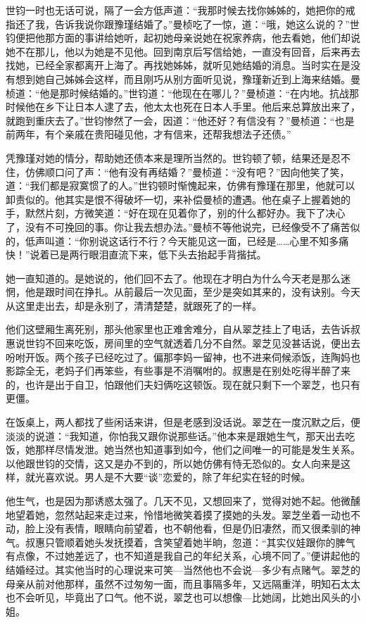 \par 世钧一时也无话可说，隔了一会方低声道：“我那时候去找你姊姊的，她把你的戒指还了我，告诉我说你跟豫瑾结婚了。”曼桢吃了一惊，道：“哦，她这么说的？”世钧便把他那方面的事讲给她听，起初她母亲说她在祝家养病，他去看她，他们却说她不在那儿，他以为她是不见他。回到南京后写信给她，一直没有回音，后来再去找她，已经全家都离开上海了。再找她姊姊，就听见她结婚的消息。当时实在是没有想到她自己姊姊会这样，而且刚巧从别方面听见说，豫瑾新近到上海来结婚。曼桢道：“他是那时候结婚的。”世钧道：“他现在在哪儿？”曼桢道：“在内地。抗战那时候他在乡下让日本人逮了去，他太太也死在日本人手里。他后来总算放出来了，就跑到重庆去了。”世钧惨然了一会，因道：“他还好？有信没有？”曼桢道：“也是前两年，有个亲戚在贵阳碰见他，才有信来，还帮我想法子还债。”
\par 凭豫瑾对她的情分，帮助她还债本来是理所当然的。世钧顿了顿，结果还是忍不住，仿佛顺口问了声：“他有没有再结婚？”曼桢道：“没有吧？”因向他笑了笑，道：“我们都是寂寞惯了的人。”世钧顿时惭愧起来，仿佛有豫瑾在那里，他就可以卸责似的。他其实是恨不得破坏一切，来补偿曼桢的遭遇。他在桌子上握着她的手，默然片刻，方微笑道：“好在现在见着你了，别的什么都好办。我下了决心了，没有不可挽回的事。你让我去想办法。”曼桢不等他说完，已经像受不了痛苦似的，低声叫道：“你别说这话行不行？今天能见这一面，已经是……心里不知多痛快！”说着已是两行眼泪直流下来，低下头去抬起手背揩拭。
\par 她一直知道的。是她说的，他们回不去了。他现在才明白为什么今天老是那么迷惘，他是跟时间在挣扎。从前最后一次见面，至少是突如其来的，没有诀别。今天从这里走出去，却是永别了，清清楚楚，就跟死了的一样。
\par 他们这壁厢生离死别，那头他家里也正难舍难分，自从翠芝挂上了电话，去告诉叔惠说世钧不回来吃饭，房间里的空气就透着几分不自然。翠芝见没甚话说，便出去吩咐开饭。两个孩子已经吃过了。偏那李妈一留神，也不进来伺候添饭，连陶妈也影踪全无，老妈子们再笨些，有些事是不消嘱咐的。叔惠是在别处吃得半醉了来的，也许是出于自卫，怕跟他们夫妇俩吃这顿饭。现在就只剩下一个翠芝，也只有更僵。
\par 在饭桌上，两人都找了些闲话来讲，但是老感到没话说。翠芝在一度沉默之后，便淡淡的说道：“我知道，你怕我又跟你说那些话。”他本来是跟她生气，那天出去吃饭，她那样尽情发泄。她当然也知道事到如今，他们之间唯一的可能是发生关系。以他跟世钧的交情，这又是办不到的，所以她仿佛有恃无恐似的。女人向来是这样，就光喜欢说。男人是不大要“谈”恋爱的，除了年纪实在轻的时候。
\par 他生气，也是因为那诱惑太强了。几天不见，又想回来了，觉得对她不起。他微醺地望着她，忽然站起来走过来，怜惜地微笑着摸了摸她的头发。翠芝坐着一动也不动，脸上没有表情，眼睛向前望着，也不朝他看，但是仍旧凄然，而又很柔驯的神气。叔惠只管顺着她头发抚摸着，含笑望着她半晌，忽道：“其实仪娃跟你的脾气有点像，不过她差远了，也不知道是我自己的年纪关系，心境不同了。”便讲起他的结婚经过。其实他当时的心理说来可笑—当然他也不会说—多少有点赌气。翠芝的母亲从前对他那样，虽然不过匆匆一面，而且事隔多年，又远隔重洋，明知石太太也不会听见，毕竟出了口气。他不说，翠芝也可以想像—比她阔，比她出风头的小姐。
